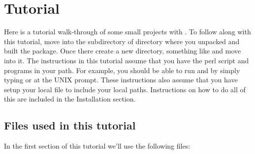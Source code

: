 \section{Tutorial}
\label{section:tutorial}

Here is a tutorial walk-through of some small projects with
. To follow along with this tutorial, move into the
 subdirectory of  directory
where you unpacked and built the  package. Once there
create a new directory, something like  and move
into it. The instructions in this tutorial assume that you have the
 perl script and  programs in your path. For
example, you should be able to run  and
 by simply typing  or
 at the UNIX prompt.  These instructions also
assume that you have setup your local
 file to include your local
paths. Instructions on how to do all of this are included in the
Installation section.

\subsection{Files used in this tutorial}

In the first section of this tutorial we'll use the following files:

